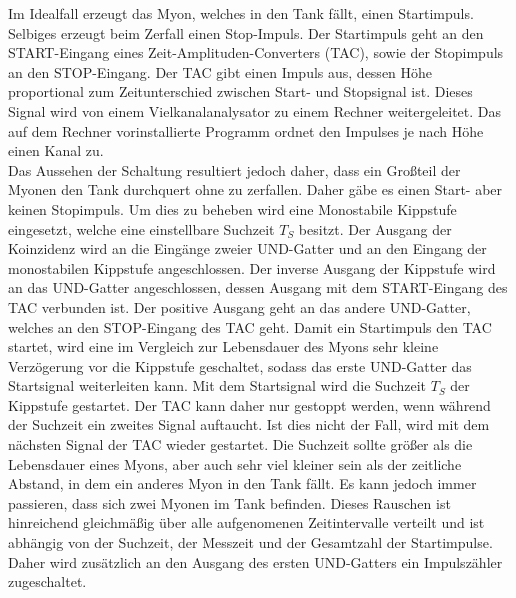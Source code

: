 Im Idealfall erzeugt das Myon, welches in den Tank fällt, einen Startimpuls.
Selbiges erzeugt beim Zerfall einen Stop-Impuls.
Der Startimpuls geht an den START-Eingang eines Zeit-Amplituden-Converters (TAC), sowie der Stopimpuls an den STOP-Eingang.
Der TAC gibt einen Impuls aus, dessen Höhe proportional zum Zeitunterschied zwischen Start- und Stopsignal ist.
Dieses Signal wird von einem Vielkanalanalysator zu einem Rechner weitergeleitet.
Das auf dem Rechner vorinstallierte Programm ordnet den Impulses je nach Höhe einen Kanal zu.\\
Das Aussehen der Schaltung resultiert jedoch daher, dass ein Großteil der Myonen den Tank durchquert ohne zu zerfallen.
Daher gäbe es einen Start- aber keinen Stopimpuls.
Um dies zu beheben wird eine Monostabile Kippstufe eingesetzt, welche eine einstellbare Suchzeit $T_S$ besitzt.
Der Ausgang der Koinzidenz wird an die Eingänge zweier UND-Gatter und an den Eingang der monostabilen Kippstufe angeschlossen.
Der inverse Ausgang der Kippstufe wird an das UND-Gatter angeschlossen, dessen Ausgang mit dem START-Eingang des TAC verbunden ist.
Der positive Ausgang geht an das andere UND-Gatter, welches an den STOP-Eingang des TAC geht.
Damit ein Startimpuls den TAC startet, wird eine im Vergleich zur Lebensdauer des Myons sehr kleine Verzögerung vor die Kippstufe geschaltet, sodass das erste UND-Gatter das Startsignal weiterleiten kann.
Mit dem Startsignal wird die Suchzeit $T_S$ der Kippstufe gestartet.
Der TAC kann daher nur gestoppt werden, wenn während der Suchzeit ein zweites Signal auftaucht.
Ist dies nicht der Fall, wird mit dem nächsten Signal der TAC wieder gestartet.
Die Suchzeit sollte größer als die Lebensdauer eines Myons, aber auch sehr viel kleiner sein als der zeitliche Abstand, in dem ein anderes Myon in den Tank fällt.
Es kann jedoch immer passieren, dass sich zwei Myonen im Tank befinden.
Dieses Rauschen ist hinreichend gleichmäßig über alle aufgenomenen Zeitintervalle verteilt und ist abhängig von der Suchzeit, der Messzeit und der Gesamtzahl der Startimpulse.
Daher wird zusätzlich an den Ausgang des ersten UND-Gatters ein Impulszähler zugeschaltet.
